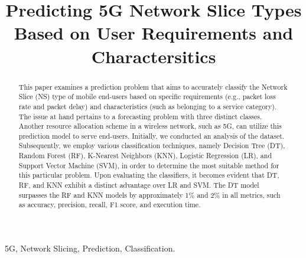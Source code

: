 \documentclass[conference]{IEEEtran}
\begin{document}
\title{Predicting 5G Network Slice Types Based on User Requirements and Charactersitics}

\author{
}

\maketitle

\begin{abstract}
This paper examines a prediction problem that aims to accurately classify the Network Slice (NS) type of mobile end-users based on specific requirements (e.g., packet loss rate and packet delay) and characteristics (such as belonging to a service category). The issue at hand pertains to a forecasting problem with three distinct classes. Another resource allocation scheme in a wireless network, such as 5G, can utilize this prediction model to serve end-users. Initially, we conducted an analysis of the dataset. Subsequently, we employ various classification techniques, namely Decision Tree (DT), Random Forest (RF), K-Nearest Neighbors (KNN), Logistic Regression (LR), and Support Vector Machine (SVM), in order to determine the most suitable method for this particular problem. Upon evaluating the classifiers, it becomes evident that DT, RF, and KNN exhibit a distinct advantage over LR and SVM. The DT model surpasses the RF and KNN models by approximately 1\% and 2\% in all metrics, such as accuracy, precision, recall, F1 score, and execution time. 
\end{abstract}

\begin{IEEEkeywords}
5G, Network Slicing, Prediction, Classification.
\end{IEEEkeywords}
\end{document}
